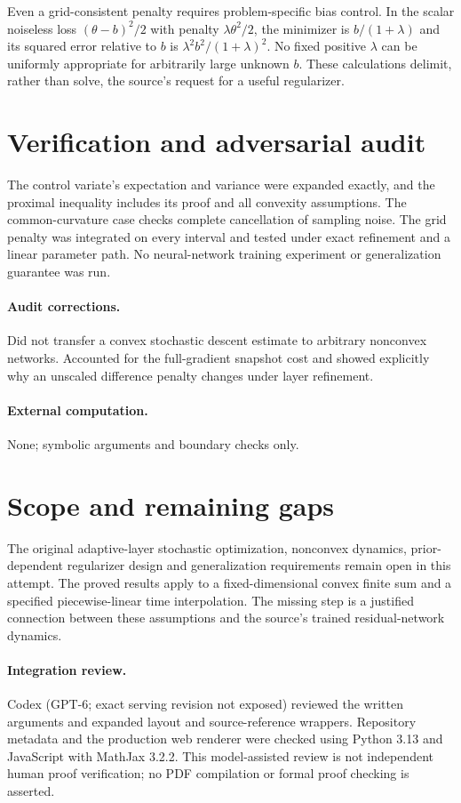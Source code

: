 \documentclass[11pt]{article}
\begin{document}
Even a grid-consistent penalty requires problem-specific bias control. In the scalar noiseless loss $(\theta-b)^2/2$ with penalty $\lambda\theta^2/2$, the minimizer is $b/(1+\lambda)$ and its squared error relative to $b$ is $\lambda^2b^2/(1+\lambda)^2$. No fixed positive $\lambda$ can be uniformly appropriate for arbitrarily large unknown $b$. These calculations delimit, rather than solve, the source's request for a useful regularizer.
\section{Verification and adversarial audit}
The control variate's expectation and variance were expanded exactly, and the proximal inequality includes its proof and all convexity assumptions. The common-curvature case checks complete cancellation of sampling noise. The grid penalty was integrated on every interval and tested under exact refinement and a linear parameter path. No neural-network training experiment or generalization guarantee was run.
\paragraph{Audit corrections.} Did not transfer a convex stochastic descent estimate to arbitrary nonconvex networks. Accounted for the full-gradient snapshot cost and showed explicitly why an unscaled difference penalty changes under layer refinement.
\paragraph{External computation.} None; symbolic arguments and boundary checks only.
\section{Scope and remaining gaps}
The original adaptive-layer stochastic optimization, nonconvex dynamics, prior-dependent regularizer design and generalization requirements remain open in this attempt. The proved results apply to a fixed-dimensional convex finite sum and a specified piecewise-linear time interpolation. The missing step is a justified connection between these assumptions and the source's trained residual-network dynamics.
\paragraph{Integration review.} Codex (GPT-6; exact serving revision not exposed) reviewed the written arguments and expanded layout and source-reference wrappers. Repository metadata and the production web renderer were checked using Python 3.13 and JavaScript with MathJax 3.2.2. This model-assisted review is not independent human proof verification; no PDF compilation or formal proof checking is asserted.
\end{document}
